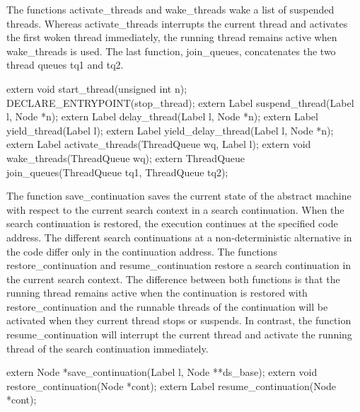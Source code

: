The functions {\Tt{}activate{\_}threads\nwendquote} and {\Tt{}wake{\_}threads\nwendquote} wake a list of
suspended threads. Whereas {\Tt{}activate{\_}threads\nwendquote} interrupts the current
thread and activates the first woken thread immediately, the running
thread remains active when {\Tt{}wake{\_}threads\nwendquote} is used. The last
function, {\Tt{}join{\_}queues\nwendquote}, concatenates the two thread queues {\Tt{}tq1\nwendquote}
and {\Tt{}tq2\nwendquote}.

\nwenddocs{}\plusendmoddef\nwstartdeflinemarkup{}\nwenddeflinemarkup
extern void start_thread(unsigned int n);
DECLARE_ENTRYPOINT(stop_thread);
extern Label suspend_thread(Label l, Node *n);
extern Label delay_thread(Label l, Node *n);
extern Label yield_thread(Label l);
extern Label yield_delay_thread(Label l, Node *n);
extern Label activate_threads(ThreadQueue wq, Label l);
extern void wake_threads(ThreadQueue wq);
extern ThreadQueue join_queues(ThreadQueue tq1, ThreadQueue tq2);

\nwendcode{}\nwdocspar
The function {\Tt{}save{\_}continuation\nwendquote} saves the current state of the
abstract machine with respect to the current search context in a
search continuation. When the search continuation is restored, the
execution continues at the specified code address. The different
search continuations at a non-deterministic alternative in the code
differ only in the continuation address. The functions
{\Tt{}restore{\_}continuation\nwendquote} and {\Tt{}resume{\_}continuation\nwendquote} restore a search
continuation in the current search context. The difference between
both functions is that the running thread remains active when the
continuation is restored with {\Tt{}restore{\_}continuation\nwendquote} and the
runnable threads of the continuation will be activated when they
current thread stops or suspends. In contrast, the function
{\Tt{}resume{\_}continuation\nwendquote} will interrupt the current thread and activate
the running thread of the search continuation immediately.

\nwenddocs{}\plusendmoddef\nwstartdeflinemarkup{}\nwenddeflinemarkup
extern Node *save_continuation(Label l, Node **ds_base);
extern void restore_continuation(Node *cont);
extern Label resume_continuation(Node *cont);

